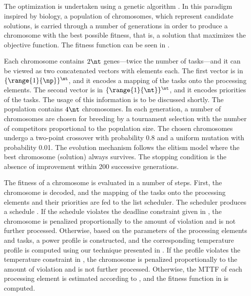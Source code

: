 \subsection{\solutiontitle}

The optimization is undertaken using a genetic algorithm \cite{schmitz2004}. In
this paradigm inspired by biology, a population of chromosomes, which represent
candidate solutions, is carried through a number of generations in order to
produce a chromosome with the best possible fitness, that is, a solution that
maximizes the objective function. The fitness function can be seen in
.

Each chromosome contains $2 \nt$ genes---twice the number of tasks---and it can
be viewed as two concatenated vectors with \nt elements each. The first vector
is in $\{ \range{1}{\np} \}^\nt$, and it encodes a mapping of the tasks onto the
processing elements. The second vector is in $\{ \range{1}{\nt} \}^\nt$, and it
encodes priorities of the tasks. The usage of this information is to be
discussed shortly. The population contains $4 \nt$ chromosomes. In each
generation, a number of chromosomes are chosen for breeding by a tournament
selection with the number of competitors proportional to the population size.
The chosen chromosomes undergo a two-point crossover with probability 0.8 and a
uniform mutation with probability 0.01. The evolution mechanism follows the
elitism model where the best chromosome (solution) always survives. The stopping
condition is the absence of improvement within 200 successive generations.

The fitness of a chromosome is evaluated in a number of steps. First, the
chromosome is decoded, and the mapping of the tasks onto the processing elements
and their priorities are fed to the list scheduler. The scheduler produces a
schedule \schedule. If the schedule violates the deadline constraint given in
, the chromosome is penalized proportionally
to the amount of violation and is not further processed. Otherwise, based on the
parameters of the processing elements and tasks, a power profile \mp is
constructed, and the corresponding temperature profile \mq is computed using our
technique presented in . If the profile
violates the temperature constraint in , the
chromosome is penalized proportionally to the amount of violation and is not
further processed. Otherwise, the \ac{MTTF} of each processing element is
estimated according to , and the fitness
function in  is computed.

